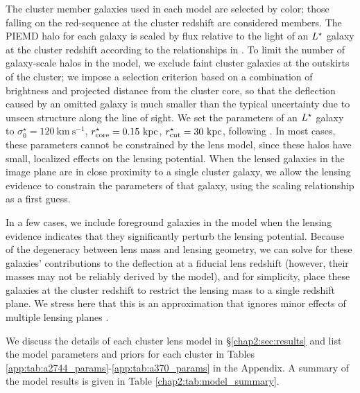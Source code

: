 The cluster member galaxies used in each model are selected by color; those falling on the red-sequence at the cluster redshift are considered members. The PIEMD halo for each galaxy is scaled by flux relative to the light of an $L^{\star}$ galaxy at the cluster redshift according to the relationships in \citet{Limousin:2005cr}. To limit the number of galaxy-scale halos in the model, we exclude faint cluster galaxies at the outskirts of the cluster; we impose a selection criterion based on a combination of brightness and projected distance from the cluster core, so that the deflection caused by an omitted galaxy is much smaller than the typical uncertainty due to unseen structure along the line of sight. We set the parameters of an $L^{\star}$ galaxy to $\sigma_0^\star=120\ \mathrm{km\ s^{-1}}$, $r_\mathrm{core}^\star=0.15\ \mathrm{kpc}$, $r_\mathrm{cut}^\star=30\ \mathrm{kpc}$, following \citet{Limousin:2008lr}. In most cases, these parameters cannot be constrained by the lens model, since these halos have small, localized effects on the lensing potential. When the lensed galaxies in the image plane are in close proximity to a single cluster galaxy, we allow the lensing evidence to constrain the parameters of that galaxy, using the scaling relationship as a first guess.

In a few cases, we include foreground galaxies in the model when the lensing evidence indicates that they significantly perturb the lensing potential. Because of the degeneracy between lens mass and lensing geometry, we can solve for these galaxies' contributions to the deflection at a fiducial lens redshift (however, their masses may not be reliably derived by the model), and for simplicity, place these galaxies at the cluster redshift to restrict the lensing mass to a single redshift plane. We stress here that this is an approximation that ignores minor effects of multiple lensing planes \citep[see, e.g.,][]{McCully:2014lr,DAloisio:2013ul}.

We discuss the details of each cluster lens model in \S \ref{chap2:sec:results} and list the model parameters and priors for each cluster in Tables \ref{app:tab:a2744_params}-\ref{app:tab:a370_params} in the Appendix. A summary of the model results is given in Table \ref{chap2:tab:model_summary}.

